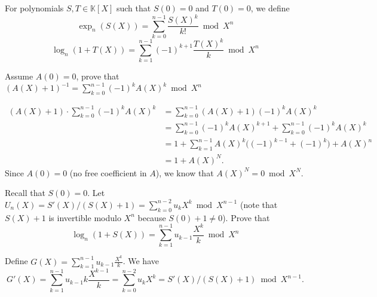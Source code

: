 \documentclass[11pt]{exam}
\theoremstyle{definition}
\newcommand{\field}{\mathbb{K}}
\begin{document}
For polynomials $S,T\in \field[X]$ such that $S(0) = 0$ and $T(0) = 0$, we define
\[\exp_n(S(X)) = \sum_{k=0}^{n-1} \frac{S(X)^k}{ k!} \bmod X^n\]
\[\log_n(1 + T(X)) = \sum_{k=1}^{n-1} (-1)^{k+1} \frac{T(X)^k }{ k }\bmod X^n\]

\begin{questions}
	\question 
	Assume $A(0) = 0$, prove that
	$(A(X)+1)^{-1} = \sum_{k = 0}^{n-1} (-1)^{k}A(X)^k \bmod X^n$
	\begin{solution}
		\vspace{-30pt}
		\begin{align*}
			(A(X)+1) \cdot \sum_{k=0}^{n-1} (-1)^k A(X)^k &= \sum_{k=0}^{n-1} (A(X)+1)(-1)^k A(X)^k \\
			&=\sum_{k=0}^{n-1} (-1)^k A(X)^{k+1} + \sum_{k=0}^{n-1} (-1)^k A(X)^k  \\
			&=1+ \sum_{k=1}^{n-1} A(X)^k \Big( (-1)^{k-1}+(-1)^k \Big) + A(X)^n \\
			&= 1 +A(X)^N.
		\end{align*}
	Since $A(0)=0$ (no free coefficient in $A$), we know that $A(X)^N = 0 \bmod X^N$.
	
	\end{solution}
	\question Recall that $S(0) = 0$. Let $U_n(X) = S'(X)/(S(X)+1) = \sum_{k=0}^{n-2} u_k X^k \bmod X^{n-1}$ (note that $S(X)+1$ is invertible modulo $X^n$ because $S(0)+1 \neq 0$).
	Prove that $$\log_n(1+S(X)) = \sum_{k=1}^{n-1} u_{k-1}\frac{X^{k}}{k} \bmod X^n$$
	\begin{solution}
		Define $G(X) = \sum_{k=1}^{n-1} u_{k-1} \frac{X^k}{k}$. We have
		\[
			G'(X) = \sum_{k=1}^{n-1} u_{k-1} k \frac{X^{k-1}}{k} = \sum_{k=0}^{n-2} u_k X^k = S'(X)/(S(X)+1) \bmod X^{n-1}.
		\]
		

\end{solution}
\end{questions}
\end{document}
